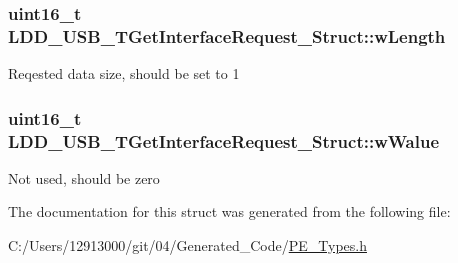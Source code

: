 \subsubsection[{w\+Length}]{\setlength{\rightskip}{0pt plus 5cm}uint16\+\_\+t L\+D\+D\+\_\+\+U\+S\+B\+\_\+\+T\+Get\+Interface\+Request\+\_\+\+Struct\+::w\+Length}\label{struct_l_d_d___u_s_b___t_get_interface_request___struct_a2aa1550fc5e72002a94c74ea0957ec74}
Reqested data size, should be set to 1 \hypertarget{struct_l_d_d___u_s_b___t_get_interface_request___struct_a48bcaf6af044e3e9669f5ea634a2b9fe}{}
\subsubsection[{w\+Walue}]{\setlength{\rightskip}{0pt plus 5cm}uint16\+\_\+t L\+D\+D\+\_\+\+U\+S\+B\+\_\+\+T\+Get\+Interface\+Request\+\_\+\+Struct\+::w\+Walue}\label{struct_l_d_d___u_s_b___t_get_interface_request___struct_a48bcaf6af044e3e9669f5ea634a2b9fe}
Not used, should be zero 

The documentation for this struct was generated from the following file\+:\begin{DoxyCompactItemize}
\item 
C\+:/\+Users/12913000/git/04/\+Generated\+\_\+\+Code/\hyperlink{_p_e___types_8h}{P\+E\+\_\+\+Types.\+h}\end{DoxyCompactItemize}
